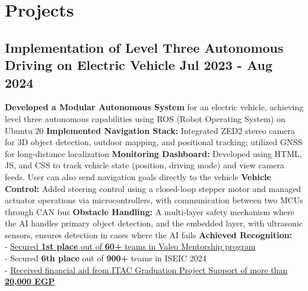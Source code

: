 \section*{Projects}
%
%
%
\subsection*{
  Implementation of Level Three Autonomous Driving on Electric Vehicle
  \hspace*{\fill}
  \dateformat Jul 2023 - Aug 2024
}
\begin{tasks}
  \task \textbf{Developed a Modular Autonomous System} for an electric vehicle, achieving level three autonomous capabilities using ROS (Robot Operating System) on Ubuntu 20
  \task \textbf{Implemented Navigation Stack:} Integrated ZED2 stereo camera for 3D object detection, outdoor mapping, and positional tracking; utilized GNSS for long-distance localization
  \task \textbf{Monitoring Dashboard:} Developed using HTML, JS, and CSS to track vehicle state (position, driving mode) and view camera feeds. User can also send navigation goals directly to the vehicle
  \task \textbf{Vehicle Control:} Added steering control using a closed-loop stepper motor and managed actuator operations via microcontrollers, with communication between two MCUs through CAN bus
  \task \textbf{Obstacle Handling:} A multi-layer safety mechanism where the AI handles primary object detection, and the embedded layer, with ultrasonic sensors, ensures detection in cases where the AI fails
  \task \textbf{Achieved Recognition:}\\
    - \href{https://www.linkedin.com/feed/update/urn:li:activity:7230237292680933376/}{Secured \textbf{1st place} out of \textbf{60+} teams in Valeo Mentorship program}\\
    - Secured \textbf{6th place} out of \textbf{900+} teams in ISEIC 2024\\
    - \href{https://itida.gov.eg/English/Programs/Graduation/Documents/List-of-Accepted-Graduation-Projects-Round-19-new.pdf}{Received financial aid from ITAC Graduation Project Support of more than \textbf{20,000 EGP}}
\end{tasks}
%
%
%
